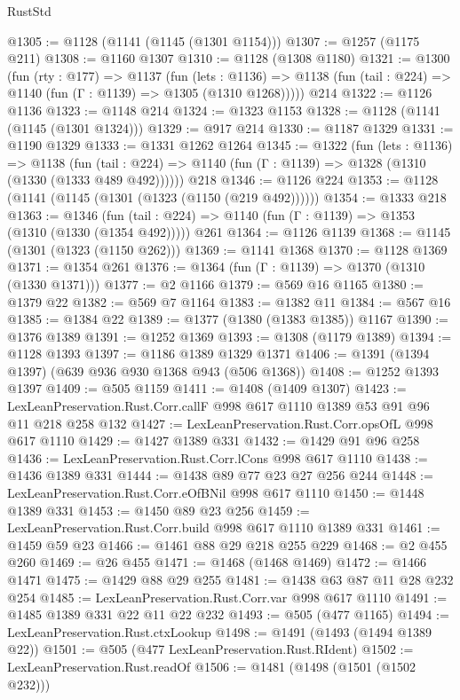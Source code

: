 \begin{lexlean}{RustStd}
\begin{coremodule}
@1305 := @1128 (@1141 (@1145 (@1301 @1154)))
@1307 := @1257 (@1175 @211)
@1308 := @1160 @1307
@1310 := @1128 (@1308 @1180)
@1321 := @1300
    (fun (rty : @177) =>
    @1137
      (fun (lets : @1136) =>
      @1138 (fun (tail : @224) => @1140 (fun (Γ : @1139) => @1305 (@1310 @1268)))))
    @214
@1322 := @1126 @1136
@1323 := @1148 @214
@1324 := @1323 @1153
@1328 := @1128 (@1141 (@1145 (@1301 @1324)))
@1329 := @917 @214
@1330 := @1187 @1329
@1331 := @1190 @1329
@1333 := @1331 @1262 @1264
@1345 := @1322
    (fun (lets : @1136) =>
    @1138 (fun (tail : @224) => @1140 (fun (Γ : @1139) => @1328 (@1310 (@1330 (@1333 @489 @492))))))
    @218
@1346 := @1126 @224
@1353 := @1128 (@1141 (@1145 (@1301 (@1323 (@1150 (@219 @492))))))
@1354 := @1333 @218
@1363 := @1346
    (fun (tail : @224) => @1140 (fun (Γ : @1139) => @1353 (@1310 (@1330 (@1354 @492)))))
    @261
@1364 := @1126 @1139
@1368 := @1145 (@1301 (@1323 (@1150 @262)))
@1369 := @1141 @1368
@1370 := @1128 @1369
@1371 := @1354 @261
@1376 := @1364 (fun (Γ : @1139) => @1370 (@1310 (@1330 @1371)))
@1377 := @2 @1166
@1379 := @569 @16 @1165
@1380 := @1379 @22
@1382 := @569 @7 @1164
@1383 := @1382 @11
@1384 := @567 @16
@1385 := @1384 @22
@1389 := @1377 (@1380 (@1383 @1385)) @1167
@1390 := @1376 @1389
@1391 := @1252 @1369
@1393 := @1308 (@1179 @1389)
@1394 := @1128 @1393
@1397 := @1186 @1389 @1329 @1371
@1406 := @1391 (@1394 @1397) (@639 @936 @930 @1368 @943 (@506 @1368))
@1408 := @1252 @1393 @1397
@1409 := @505 @1159
@1411 := @1408 (@1409 @1307)
@1423 := LexLeanPreservation.Rust.Corr.callF @998 @617 @1110 @1389 @53 @91 @96 @11 @218 @258 @132
@1427 := LexLeanPreservation.Rust.Corr.opsOfL @998 @617 @1110
@1429 := @1427 @1389 @331
@1432 := @1429 @91 @96 @258
@1436 := LexLeanPreservation.Rust.Corr.lCons @998 @617 @1110
@1438 := @1436 @1389 @331
@1444 := @1438 @89 @77 @23 @27 @256 @244
@1448 := LexLeanPreservation.Rust.Corr.eOfBNil @998 @617 @1110
@1450 := @1448 @1389 @331
@1453 := @1450 @89 @23 @256
@1459 := LexLeanPreservation.Rust.Corr.build @998 @617 @1110 @1389 @331
@1461 := @1459 @59 @23
@1466 := @1461 @88 @29 @218 @255 @229
@1468 := @2 @455 @260
@1469 := @26 @455
@1471 := @1468 (@1468 @1469)
@1472 := @1466 @1471
@1475 := @1429 @88 @29 @255
@1481 := @1438 @63 @87 @11 @28 @232 @254
@1485 := LexLeanPreservation.Rust.Corr.var @998 @617 @1110
@1491 := @1485 @1389 @331 @22 @11 @22 @232
@1493 := @505 (@477 @1165)
@1494 := LexLeanPreservation.Rust.ctxLookup
@1498 := @1491 (@1493 (@1494 @1389 @22))
@1501 := @505 (@477 LexLeanPreservation.Rust.RIdent)
@1502 := LexLeanPreservation.Rust.readOf
@1506 := @1481 (@1498 (@1501 (@1502 @232)))

\end{coremodule}
\end{lexlean}
